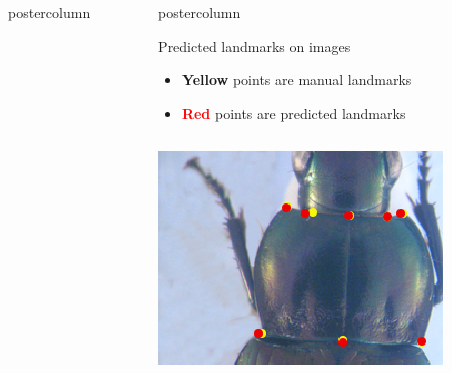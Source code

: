 \begin{frame}
\begin{columns}
\begin{column}{.53\textwidth}
\begin{beamercolorbox}[center,wd=\textwidth]{postercolumn}
\begin{minipage}[T]{.95\textwidth}
{          }
        \end{minipage}
      \end{beamercolorbox}
    \end{column}
     
    
    \begin{column}{.53\textwidth}
      \begin{beamercolorbox}[center,wd=\textwidth]{postercolumn}
        \begin{minipage}[T]{.95\textwidth}
          \parbox[t][\columnheight]{\textwidth}{
            
            \begin{block}{Predicted landmarks on images}
            	\begin{itemize}
            		\item \textbf{\textcolor{myyellow}{Yellow}} points are manual landmarks
            		\item \textbf{\textcolor{red}{Red}} points are predicted landmarks
            	\end{itemize}
            	\begin{columns}
            		\begin{column}{.45\textwidth}
            			\centering
            			\includegraphics[width=.90\textwidth]{images/Prono_115.eps}
            		\end{column}
            		\begin{column}{.45\textwidth}
            			\centering

\end{column}
\end{columns}
\end{block}}
\end{minipage}
\end{beamercolorbox}
\end{column}
\end{columns}
\end{frame}
